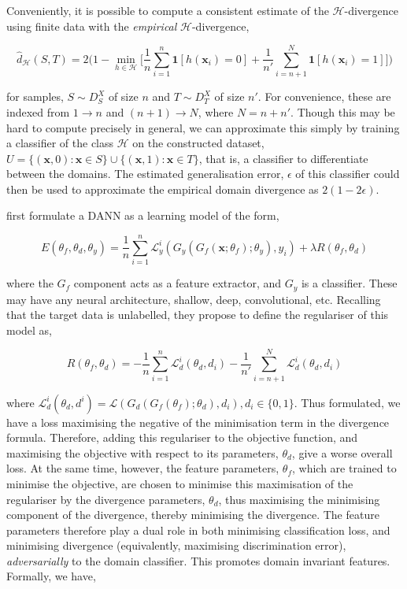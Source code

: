 Conveniently, it is possible to compute a consistent estimate of the $\mathcal{H}$-divergence using finite data with the \emph{empirical} $\mathcal{H}$-divergence,

\begin{equation}
\hat{d}_\mathcal{H}(S, T) = 2\Bigg(1 - \min_{h \in \mathcal{H}}\bigg[\frac{1}{n}\sum_{i=1}^n\mathbf{1}[h(\mathbf{x}_i) = 0] + \frac{1}{n'}\sum_{i=n+1}^N\mathbf{1}[h(\mathbf{x}_i) = 1]\bigg]\Bigg)
\end{equation}

for samples, $S \sim D_S^X$ of size $n$ and $T \sim D_T^X$ of size $n'$. For convenience, these are indexed from $1\to n$ and $(n + 1) \to N$, where $N = n + n'$. Though this may be hard to compute precisely in general, we can approximate this simply by training a classifier of the class $\mathcal{H}$ on the constructed dataset, $U = \{(\mathbf{x}, 0) : \mathbf{x} \in S\} \cup \{(\mathbf{x}, 1) : \mathbf{x} \in T\}$, that is, a classifier to differentiate between the domains. The estimated generalisation error, $\epsilon$ of this classifier could then be used to approximate the empirical domain divergence as $2(1 - 2\epsilon)$.

\cite{ajakan2014domain} first formulate a DANN as a learning model of the form,

\begin{equation}
E(\theta_f, \theta_d, \theta_y) = \frac{1}{n}\sum_{i=1}^n\mathcal{L}_y^i(G_y(G_f(\mathbf{x} ; \theta_f) ; \theta_y), y_i) + \lambda R(\theta_f, \theta_d)
\end{equation}

where the $G_f$ component acts as a feature extractor, and $G_y$ is a classifier. These may have any neural architecture, shallow, deep, convolutional, etc. Recalling that the target data is unlabelled, they propose to define the regulariser of this model as,


\begin{equation}
R(\theta_f, \theta_d) = -\frac{1}{n}\sum_{i=1}^n\mathcal{L}_d^i(\theta_d, d_i) -\frac{1}{n'}\sum_{i=n+1}^N\mathcal{L}_d^i(\theta_d, d_i)
\end{equation}

where $\mathcal{L}_d^i(\theta_d, d^i) = \mathcal{L}(G_d(G_f(\theta_f) ; \theta_d), d_i), d_i \in \{0, 1\}$. Thus formulated, we have a loss maximising the negative of the minimisation term in the divergence formula. Therefore, adding this regulariser to the objective function, and maximising the objective with respect to its parameters, $\theta_d$, give a worse overall loss. At the same time, however, the feature parameters, $\theta_f$, which are trained to minimise the objective, are chosen to minimise this maximisation of the regulariser by the divergence parameters, $\theta_d$, thus maximising the minimising component of the divergence, thereby minimising the divergence. The feature parameters therefore play a dual role in both minimising classification loss, and minimising divergence (equivalently, maximising discrimination error), \emph{adversarially} to the domain classifier. This promotes domain invariant features. Formally, we have,

